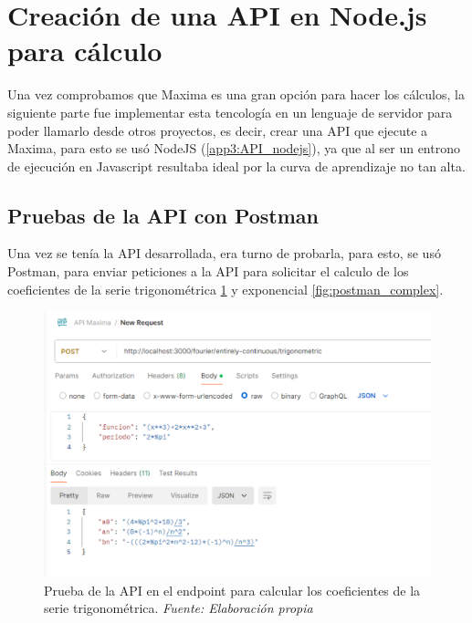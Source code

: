 \section{Creación de una API en Node.js para cálculo}
Una vez comprobamos que Maxima es una gran opción para hacer los cálculos, la siguiente parte fue implementar esta tencología en un lenguaje de servidor para poder llamarlo desde otros proyectos, es decir, crear una API que ejecute a Maxima, para esto se usó NodeJS (\ref{app3:API_nodejs}), ya que al ser un entrono de ejecución en Javascript resultaba ideal por la curva de aprendizaje no tan alta.

\subsection{Pruebas de la API con Postman}
Una vez se tenía la API desarrollada, era turno de probarla, para esto, se usó Postman, para enviar peticiones a la API para solicitar el calculo de los coeficientes de la serie trigonométrica \ref{fig:postman_trig} y exponencial \ref{fig:postman_complex}.
\begin{figure}[H]
	\centering
	\includegraphics[width=1\textwidth]{img/chapter06/postman_trig.png}
	\caption[Prueba de la API en el endpoint para calcular los coeficientes de la serie trigonométrica.]{Prueba de la API en el endpoint para calcular los coeficientes de la serie trigonométrica. \textit{Fuente: Elaboración propia}}
	\label{fig:postman_trig}
\end{figure}

